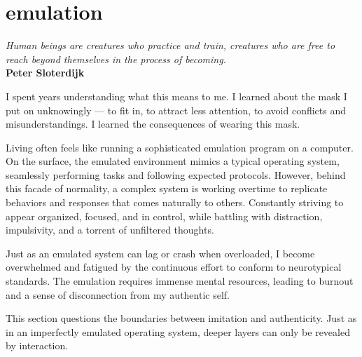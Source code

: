 \chapter*{emulation}
\begin{center}
\vspace{2cm}
\begin{flushright}
\large
\textit{ Human beings are creatures who practice and train, creatures who are free to reach beyond themselves in the process of becoming.}\\
\textbf{ Peter Sloterdijk } 
\citep{sloterdijk2014}
\end{flushright}
\vspace{2cm}
\end{center}
\normalsize

I spent years understanding what this means to me. I learned about the mask I put on unknowingly — to fit in, to attract less attention, to avoid conflicts and misunderstandings. I learned the consequences of wearing this mask. 

Living often feels like running a sophisticated emulation program on a computer. On the surface, the emulated environment mimics a typical operating system, seamlessly performing tasks and following expected protocols. However, behind this facade of normality, a complex system is working overtime to replicate behaviors and responses that comes naturally to others. Constantly striving to appear organized, focused, and in control, while battling with distraction, impulsivity, and a torrent of unfiltered thoughts.

Just as an emulated system can lag or crash when overloaded, I become overwhelmed and fatigued by the continuous effort to conform to neurotypical standards. The emulation requires immense mental resources, leading to burnout and a sense of disconnection from my authentic self.

This section questions the boundaries between imitation and authenticity. Just as in an imperfectly emulated operating system, deeper layers can only be revealed by interaction.

